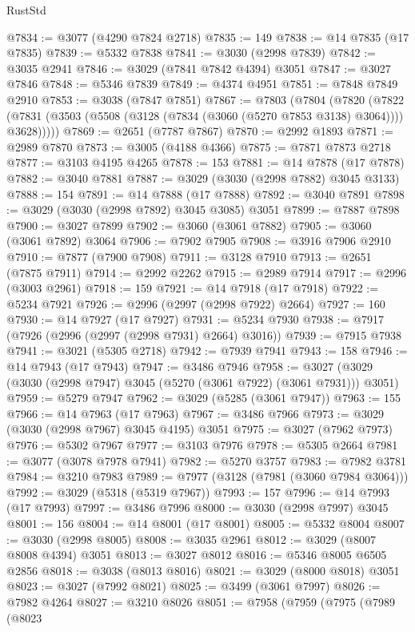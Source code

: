 \begin{lexlean}{RustStd}
\begin{coremodule}
@7834 := @3077 (@4290 @7824 @2718)
@7835 := 149
@7838 := @14 @7835 (@17 @7835)
@7839 := @5332 @7838
@7841 := @3030 (@2998 @7839)
@7842 := @3035 @2941
@7846 := @3029 (@7841 @7842 @4394) @3051
@7847 := @3027 @7846
@7848 := @5346 @7839
@7849 := @4374 @4951
@7851 := @7848 @7849 @2910
@7853 := @3038 (@7847 @7851)
@7867 := @7803
    (@7804
      (@7820
        (@7822 (@7831 (@3503 (@5508 (@3128 (@7834 (@3060 (@5270 @7853 @3138) @3064)))) @3628)))))
@7869 := @2651 (@7787 @7867)
@7870 := @2992 @1893
@7871 := @2989 @7870
@7873 := @3005 (@4188 @4366)
@7875 := @7871 @7873 @2718
@7877 := @3103 @4195 @4265
@7878 := 153
@7881 := @14 @7878 (@17 @7878)
@7882 := @3040 @7881
@7887 := @3029 (@3030 (@2998 @7882) @3045 @3133)
@7888 := 154
@7891 := @14 @7888 (@17 @7888)
@7892 := @3040 @7891
@7898 := @3029 (@3030 (@2998 @7892) @3045 @3085) @3051
@7899 := @7887 @7898
@7900 := @3027 @7899
@7902 := @3060 (@3061 @7882)
@7905 := @3060 (@3061 @7892) @3064
@7906 := @7902 @7905
@7908 := @3916 @7906 @2910
@7910 := @7877 (@7900 @7908)
@7911 := @3128 @7910
@7913 := @2651 (@7875 @7911)
@7914 := @2992 @2262
@7915 := @2989 @7914
@7917 := @2996 (@3003 @2961)
@7918 := 159
@7921 := @14 @7918 (@17 @7918)
@7922 := @5234 @7921
@7926 := @2996 (@2997 (@2998 @7922) @2664)
@7927 := 160
@7930 := @14 @7927 (@17 @7927)
@7931 := @5234 @7930
@7938 := @7917 (@7926 (@2996 (@2997 (@2998 @7931) @2664) @3016))
@7939 := @7915 @7938
@7941 := @3021 (@5305 @2718)
@7942 := @7939 @7941
@7943 := 158
@7946 := @14 @7943 (@17 @7943)
@7947 := @3486 @7946
@7958 := @3027 (@3029 (@3030 (@2998 @7947) @3045 (@5270 (@3061 @7922) (@3061 @7931))) @3051)
@7959 := @5279 @7947
@7962 := @3029 (@5285 (@3061 @7947))
@7963 := 155
@7966 := @14 @7963 (@17 @7963)
@7967 := @3486 @7966
@7973 := @3029 (@3030 (@2998 @7967) @3045 @4195) @3051
@7975 := @3027 (@7962 @7973)
@7976 := @5302 @7967
@7977 := @3103 @7976
@7978 := @5305 @2664
@7981 := @3077 (@3078 @7978 @7941)
@7982 := @5270 @3757
@7983 := @7982 @3781
@7984 := @3210 @7983
@7989 := @7977 (@3128 (@7981 (@3060 @7984 @3064)))
@7992 := @3029 (@5318 (@5319 @7967))
@7993 := 157
@7996 := @14 @7993 (@17 @7993)
@7997 := @3486 @7996
@8000 := @3030 (@2998 @7997) @3045
@8001 := 156
@8004 := @14 @8001 (@17 @8001)
@8005 := @5332 @8004
@8007 := @3030 (@2998 @8005)
@8008 := @3035 @2961
@8012 := @3029 (@8007 @8008 @4394) @3051
@8013 := @3027 @8012
@8016 := @5346 @8005 @6505 @2856
@8018 := @3038 (@8013 @8016)
@8021 := @3029 (@8000 @8018) @3051
@8023 := @3027 (@7992 @8021)
@8025 := @3499 (@3061 @7997)
@8026 := @7982 @4264
@8027 := @3210 @8026
@8051 := @7958
    (@7959
      (@7975
        (@7989
          (@8023

\end{coremodule}
\end{lexlean}
